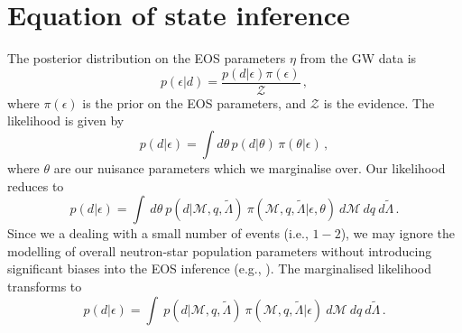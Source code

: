 \documentclass[twocolumn]{aastex631}
\begin{document}
\appendix


\section{Equation of state inference}
\label{sec:EOS_inference}

The posterior distribution on the EOS parameters $\eta$ from the GW data is
%
\begin{equation}
  p(\epsilon| d) = \frac{p(d|{\epsilon})\pi(\epsilon)}{\mathcal{Z}}\,,
\end{equation}
%
where $\pi(\epsilon)$ is the prior on the EOS parameters, and
$\mathcal{Z}$ is the evidence. The likelihood is given by
%
\begin{equation}
    p(d|\epsilon) = \int  d\theta \,p(d|\theta)\,\pi(\theta|\epsilon)\,,
\end{equation}
%
where $\theta$ are our nuisance parameters which we marginalise over.
Our likelihood reduces to
%
\begin{equation}
    p(d|\epsilon) = \int \ d\theta \ p(d|\mathcal{M},q,\tilde{\Lambda})
    \ \pi(\mathcal{M},q,\tilde{\Lambda}|\epsilon,\theta) \ d\mathcal{M}
    \ dq \ d \tilde{\Lambda}\,.
\end{equation}
%
Since we a dealing with a small number of events (i.e., $1-2$), we may
ignore the modelling of overall neutron-star population parameters
without introducing significant biases into the EOS inference (e.g.,
\citealt{2015Agathos, 2020Wysocki, 2020Landry}). The marginalised
likelihood transforms to
%
\begin{equation}
    p(d|\epsilon) = \int \ p(d|\mathcal{M},q,\tilde{\Lambda})
    \ \pi(\mathcal{M},q,\tilde{\Lambda}|\epsilon)\ d\mathcal{M} \ dq \ d
    \tilde{\Lambda}\,.
    \label{eq:P_d_eps}
\end{equation}
\end{document}
